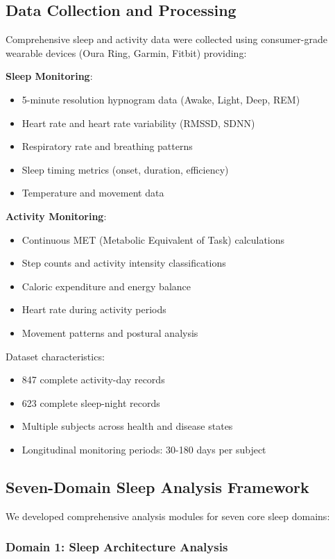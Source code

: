 \documentclass[twocolumn]{article}
\begin{document}
\subsection{Data Collection and Processing}

Comprehensive sleep and activity data were collected using consumer-grade wearable devices (Oura Ring, Garmin, Fitbit) providing:

\textbf{Sleep Monitoring}:
\begin{itemize}
\item 5-minute resolution hypnogram data (Awake, Light, Deep, REM)
\item Heart rate and heart rate variability (RMSSD, SDNN)
\item Respiratory rate and breathing patterns
\item Sleep timing metrics (onset, duration, efficiency)
\item Temperature and movement data
\end{itemize}

\textbf{Activity Monitoring}:
\begin{itemize}
\item Continuous MET (Metabolic Equivalent of Task) calculations
\item Step counts and activity intensity classifications
\item Caloric expenditure and energy balance
\item Heart rate during activity periods
\item Movement patterns and postural analysis
\end{itemize}

Dataset characteristics:
\begin{itemize}
\item 847 complete activity-day records
\item 623 complete sleep-night records
\item Multiple subjects across health and disease states
\item Longitudinal monitoring periods: 30-180 days per subject
\end{itemize}

\subsection{Seven-Domain Sleep Analysis Framework}

We developed comprehensive analysis modules for seven core sleep domains:

\subsubsection{Domain 1: Sleep Architecture Analysis}
\end{document}
